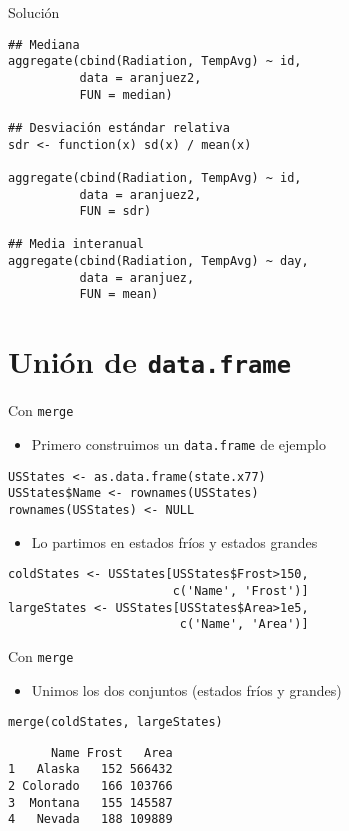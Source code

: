 \documentclass[aspectratio=169, usenames,svgnames,dvipsnames]{beamer}
\begin{document}
\begin{frame}[label={sec:org7b6a550},fragile]{Solución}
 \lstset{language=r,label= ,caption= ,captionpos=b,numbers=none}
\begin{lstlisting}
## Mediana
aggregate(cbind(Radiation, TempAvg) ~ id,
          data = aranjuez2,
          FUN = median)

## Desviación estándar relativa
sdr <- function(x) sd(x) / mean(x)

aggregate(cbind(Radiation, TempAvg) ~ id,
          data = aranjuez2,
          FUN = sdr)

## Media interanual
aggregate(cbind(Radiation, TempAvg) ~ day,
          data = aranjuez,
          FUN = mean)
\end{lstlisting}
\end{frame}

\section{Unión de \texttt{data.frame}}
\label{sec:orgeb8cabf}
\begin{frame}[label={sec:org8b8852d},fragile]{Con \texttt{merge}}
 \begin{itemize}
\item Primero construimos un \texttt{data.frame} de ejemplo
\end{itemize}
\lstset{language=r,label= ,caption= ,captionpos=b,numbers=none}
\begin{lstlisting}
USStates <- as.data.frame(state.x77)
USStates$Name <- rownames(USStates)
rownames(USStates) <- NULL
\end{lstlisting}

\begin{itemize}
\item Lo partimos en estados \guillemotleft{}fríos\guillemotright{} y estados \guillemotleft{}grandes\guillemotright{}
\end{itemize}
\lstset{language=r,label= ,caption= ,captionpos=b,numbers=none}
\begin{lstlisting}
coldStates <- USStates[USStates$Frost>150,
                       c('Name', 'Frost')]
largeStates <- USStates[USStates$Area>1e5,
                        c('Name', 'Area')]
\end{lstlisting}
\end{frame}

\begin{frame}[label={sec:org9555fd0},fragile]{Con \texttt{merge}}
 \begin{itemize}
\item Unimos los dos conjuntos (estados \guillemotleft{}fríos\guillemotright{} y \guillemotleft{}grandes\guillemotright{})
\end{itemize}
\lstset{language=r,label= ,caption= ,captionpos=b,numbers=none}
\begin{lstlisting}
merge(coldStates, largeStates)
\end{lstlisting}

\begin{verbatim}
      Name Frost   Area
1   Alaska   152 566432
2 Colorado   166 103766
3  Montana   155 145587
4   Nevada   188 109889
\end{verbatim}
\end{frame}
\end{document}
